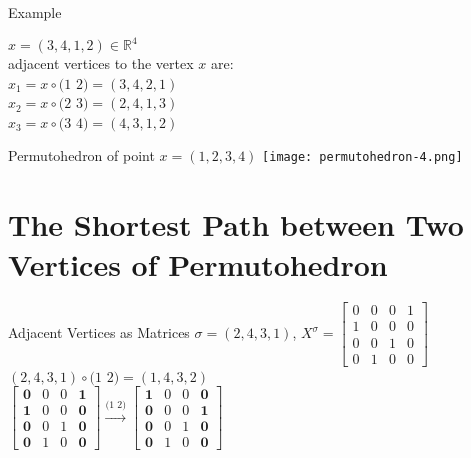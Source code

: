 \documentclass{beamer}
\theoremstyle{plain}
\theoremstyle{definition}
\begin{document}
\begin{frame}{Example}
\begin{Example}
$x = (3,4,1,2) \in \mathbb{R}^4$ \\
adjacent vertices to the vertex $x$ are:\\ 
$x_1 = x \circ (1$ $2) = (3,4,2,1)$  \\
$x_2 = x \circ (2$ $3) = (2,4,1,3)$ \\
$x_3 = x \circ (3$ $4) = (4,3,1,2)$ 
\end{Example}  
\end{frame}
\begin{frame}{Permutohedron of point $x = (1,2,3,4)$ }
    \centering
    \texttt{[image: permutohedron-4.png]}
\end{frame}

\section{The Shortest Path between Two Vertices of Permutohedron}
\begin{frame}{Adjacent Vertices as Matrices}
     $\sigma = (2,4,3,1)$, 
     $X^{\sigma} =\begin{bmatrix}
        0 & 0 & 0 & 1 \\ 1 & 0 & 0 & 0 \\ 0 & 0 & 1 & 0 \\ 0 & 1 & 0 & 0
    \end{bmatrix} $ \\ \vspace{0.3cm}
    \pause
    $(2,4,3,1) \circ (1$ $2) = (1,4,3,2)$ \\ \vspace{0.3cm}
    $\begin{bmatrix}
        \mathbf{0} & 0 & 0 & \mathbf{1} \\ \mathbf{1} & 0 & 0 & \mathbf{0} \\ \mathbf{0} & 0 & 1 & \mathbf{0} \\ \mathbf{0} & 1 & 0 & \mathbf{0}
    \end{bmatrix}  \stackrel{\text{(1 2)}}{\longrightarrow} \begin{bmatrix}
        \mathbf{1} & 0 & 0 & \mathbf{0} \\ \mathbf{0} & 0 & 0 & \mathbf{1} \\ \mathbf{0} & 0 & 1 & \mathbf{0} \\ \mathbf{0} & 1 & 0 & \mathbf{0}
    \end{bmatrix}
    $
    
\end{frame}
\end{document}
